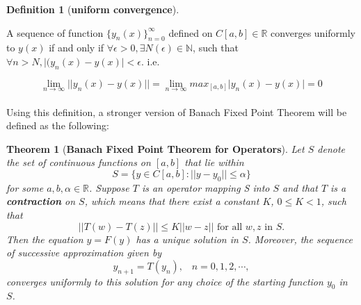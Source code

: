 \documentclass{article}
\newtheorem{theorem}{Theorem}[section]
\theoremstyle{definition}
\newtheorem{definition}{Definition}[section]
\theoremstyle{remark}
\begin{document}
\begin{definition}[\textbf{uniform convergence}]\label{def:uniConv}

A sequence of function $\{y_n(x)\}_{n = 0}^{\infty}$ defined on $C[a,b] \in \mathbb{R}$ converges uniformly to $y(x)$ if and only if $\forall \epsilon > 0, \exists N(\epsilon) \in \mathbb{N}$, such that $\forall n > N, {\lvert(y_n(x) - y(x)\rvert} < \epsilon$. i.e. 

\begin{equation}
    \lim_{n \to \infty}{\lvert\lvert y_n(x) - y(x) \rvert\rvert} = \lim_{n \to \infty}{max_{[a,b]}{\lvert y_n(x)-y(x)\rvert}} = 0
\end{equation}

\end{definition}

\paragraph{  }

Using this definition, a stronger version of Banach Fixed Point Theorem will be defined as the following:

\begin{theorem}[\textbf{Banach Fixed Point Theorem for Operators}]\label{thm:BFPTO}
    Let $S$ denote the set of continuous functions on $[a,b]$ that lie within
    \begin{equation}
        S = \{y\in C[a,b]:\lvert\lvert y - y_0\rvert\rvert \leq \alpha\}
    \end{equation}
    for some $a, b, \alpha\in \mathbb{R}$. Suppose $T$ is an operator mapping S into $S$ and that $T$ is a \textbf{contraction} on $S$, which means that there exist a constant $K$, $0\leq K < 1$, such that 
\begin{equation}\label{eqn:contractionO}
    \lvert\lvert T(w) - T(z) \rvert\rvert \leq K\lvert\lvert w - z \rvert\rvert \text{ for all } w,z \text{ in } S \text{.}
\end{equation}
Then the equation $y = F(y)$ has a unique solution in $S$. Moreover, the sequence of successive approximation given by
\begin{equation}\label{eqn:ssoex}
    y_{n+1} = T(y_n), \; \; \; n = 0, 1, 2, \cdots,
\end{equation}
converges uniformly to this solution for any choice of the starting function $y_0$ in $S$.
\end{theorem}

\paragraph{  }
\end{document}
